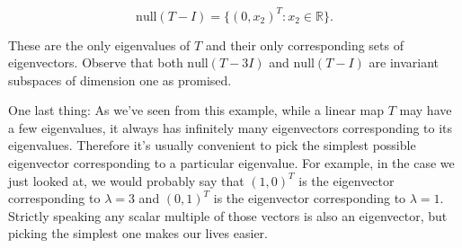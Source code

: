 \documentclass[12pt]{article}
\begin{document}
$$\textrm{null} (T - I) = \{ (0, x_2)^T : x_2 \in \mathbb{R} \}.$$

These are the only eigenvalues of $T$ and their only corresponding sets of eigenvectors. Observe that both $\textrm{null} (T - 3I)$ and $\textrm{null} (T - I)$ are invariant subspaces of dimension one as promised.

\vskip 3mm
One last thing: As we've seen from this example, while a linear map $T$ may have a few eigenvalues, it always has infinitely many eigenvectors corresponding to its eigenvalues. Therefore it's usually convenient to pick the simplest possible eigenvector corresponding to a particular eigenvalue. For example, in the case we just looked at, we would probably say that $(1, 0)^T$ is the eigenvector corresponding to $\lambda = 3$ and $(0, 1)^T$ is the eigenvector corresponding to $\lambda = 1$. Strictly speaking any scalar multiple of those vectors is also an eigenvector, but picking the simplest one makes our lives easier. 
\end{document}
